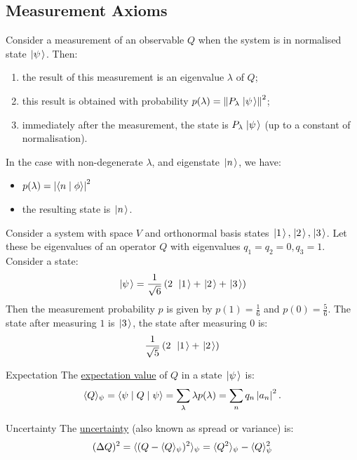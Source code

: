 \documentclass[../Main.tex]{subfiles}
\begin{document}
\subsection{Measurement Axioms}
Consider a measurement of an observable $Q$ when the system is in normalised state $\left.\left|\psi\right.\right\rangle$. Then:
\begin{enumerate}
    \item the result of this measurement is an eigenvalue $\lambda$ of $Q$; \label{axMeasureIsEVal}
    \item this result is obtained with probability $p(\lambda) = \left\|P_\lambda \left.\left|\psi\right.\right\rangle\right\|^2$; \label{axMeasureProb}
    \item immediately after the measurement, the state is $P_\lambda \left.\left|\psi\right.\right\rangle$ (up to a constant of normalisation). \label{axStateCollapse}
\end{enumerate}
In the case with non-degenerate $\lambda$, and eigenstate $\left.\left|n\right.\right\rangle$, we have:
\begin{itemize}
    \item $p(\lambda) = \left|\langle n\mid\phi\rangle\right|^2$
    \item the resulting state is $\left.\left|n\right.\right\rangle$.
\end{itemize}
\begin{example} \label{exOrthoStates}
    Consider a system with space $V$ and orthonormal basis states $\left.\left|1\right.\right\rangle, \left.\left|2\right.\right\rangle, \left.\left|3\right.\right\rangle$. Let these be eigenvalues of an operator $Q$ with eigenvalues $q_1 = q_2 = 0, q_3 = 1$. Consider a state:
    \begin{equation*}
        \left.\left|\psi\right.\right\rangle = \frac1{\sqrt{6}} \left(2~\left.\left|1\right.\right\rangle+\left.\left|2\right.\right\rangle+\left.\left|3\right.\right\rangle\right)
    \end{equation*}
    Then the measurement probability $p$ is given by $p(1) = \frac16$ and $p(0) = \frac56$. The state after measuring $1$ is $\left.\left|3\right.\right\rangle$, the state after measuring $0$ is:
    \begin{equation*}
        \frac1{\sqrt5} \left(2~\left.\left|1\right.\right\rangle + \left.\left|2\right.\right\rangle\right)
    \end{equation*}
\end{example}
\begin{definition}{Expectation}
    The \underline{expectation value} of $Q$ in a state $\left.\left|\psi\right.\right\rangle$ is:
    \begin{equation*}
        \langle Q \rangle_\psi = \langle\psi\mid Q\mid\psi\rangle = \sum_\lambda \lambda p(\lambda) = \sum_n q_n \left|a_n\right|^2.
    \end{equation*}
\end{definition}
\begin{definition}{Uncertainty}
    The \underline{uncertainty} (also known as spread or variance) is:
    \begin{equation*}
        (\Delta Q)^2 = \langle (Q - \langle Q \rangle_\psi)^2 \rangle_\psi = \langle Q^2 \rangle_\psi - \langle Q \rangle_\psi^2
    \end{equation*}
\end{definition}
\end{document}
